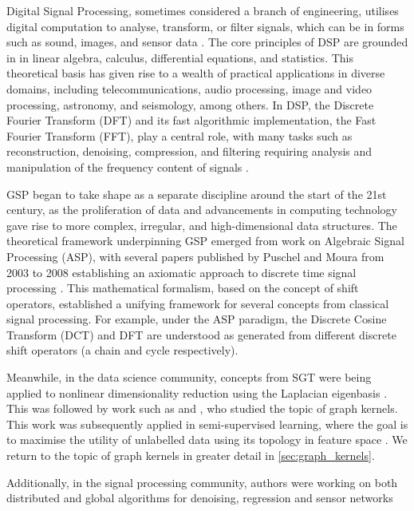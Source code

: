 Digital Signal Processing, sometimes considered a branch of engineering, utilises digital computation to analyse, transform, or filter signals, which can be in forms such as sound, images, and sensor data \citep{Rabiner1975}. The core principles of DSP are grounded in in linear algebra, calculus, differential equations, and statistics. This theoretical basis has given rise to a wealth of practical applications in diverse domains, including telecommunications, audio processing, image and video processing, astronomy, and seismology, among others. In DSP, the Discrete Fourier Transform (DFT) and its fast algorithmic implementation, the Fast Fourier Transform (FFT), play a central role, with many tasks such as reconstruction, denoising, compression, and filtering requiring analysis and manipulation of the frequency content of signals \citep{Duhamel1990}.


GSP began to take shape as a separate discipline around the start of the 21st century, as the proliferation of data and advancements in computing technology gave rise to more complex, irregular, and high-dimensional data structures. The theoretical framework underpinning GSP emerged from work on Algebraic Signal Processing (ASP), with several papers published by Puschel and Moura from 2003 to 2008 establishing an axiomatic approach to discrete time signal processing \citep{Puschel2003,Puschel2006,Puschel2008}. This mathematical formalism, based on the concept of shift operators, established a unifying framework for several concepts from classical signal processing. For example, under the ASP paradigm, the Discrete Cosine Transform (DCT) and DFT are understood as generated from different discrete shift operators (a chain and cycle respectively). 

Meanwhile, in the data science community, concepts from SGT were being applied to nonlinear dimensionality reduction using the Laplacian eigenbasis \citep{Roweis2000,Belkin2003,Donoho2003}. This was followed by work such as \cite{Kondor2002}
and \citep{Smola2003}, who studied the topic of graph kernels. This work was subsequently applied in semi-supervised learning, where the goal is to maximise the utility of unlabelled data using its topology in feature space \citep{Belkin2004,Zhou2004,Zhu2003}. We return to the topic of graph kernels in greater detail in \cref{sec:graph_kernels}. 

Additionally, in the signal processing community, authors were working on both distributed and global algorithms for denoising, regression and sensor networks

